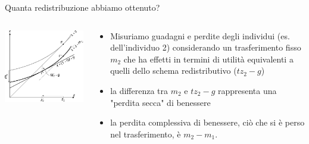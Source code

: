 \documentclass[aspectratio=64,11pt]{beamer}
\begin{document}
\begin{frame}{Quanta redistribuzione abbiamo ottenuto?}
\begin{columns}
\begin{column}{.55\columnwidth}
\begin{center}
\includegraphics[width=\textwidth]{./figure/effetto-distorsivo-imposte-ql-4.pdf}
\end{center}
\end{column}


\begin{column}{.45\columnwidth}
\begin{itemize}
\item Misuriamo guadagni e perdite degli individui (es. dell'individuo 2)
considerando un trasferimento fisso $m_2$ che ha effetti in termini di
utilità equivalenti a quelli dello schema redistributivo ($tz_2-g$)
\item la differenza tra $m_2$ e $tz_2-g$ rappresenta una "perdita secca" di
benessere
\item la perdita complessiva di benessere, ciò che si è perso nel
trasferimento, è $m_2-m_1$.
\end{itemize}
\end{column}
\end{columns}
\end{frame}
\end{document}
